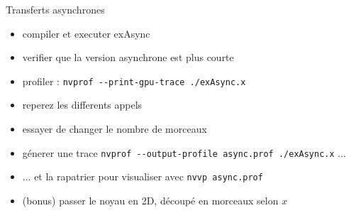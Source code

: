 \documentclass[11pt,mathserif]{beamer}
\newcommand{\scout}{\faAngellist}
\newcommand{\galde}{\faQuestion}
\newcommand{\hand}{\faHandORight}
\newcommand{\kontuz}{\faExclamationTriangle}
\newcommand{\adibi}{\faCommentO}
\begin{document}
\begin{frame}{Transferts asynchrones}
\begin{itemize}
  \item[\adibi] compiler et executer exAsync
  \item[\galde] verifier que la version asynchrone est plus courte
  \item[\faClockO] profiler : \lstinline$nvprof --print-gpu-trace ./exAsync.x$
  \item[\kontuz] reperez les differents appels 
  \item[\adibi] essayer de changer le nombre de morceaux
  \item[\scout] génerer une trace \lstinline$nvprof --output-profile async.prof ./exAsync.x$ ...
  \item[\hand]... et la rapatrier pour visualiser avec \lstinline$nvvp async.prof$
  \item[\scout] (bonus) passer le noyau en 2D, découpé en morceaux selon $x$
\end{itemize}
\end{frame}
\end{document}
